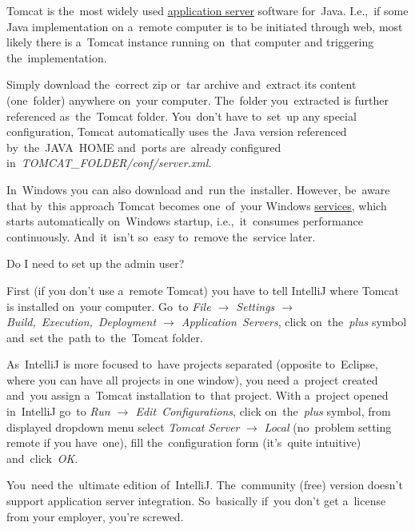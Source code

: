 \label{tomcat}
Tomcat is the~most widely used \hyperref[applicationserver]{application server} software for~Java. I.e.,~if some Java implementation on a~remote computer is to be initiated through web, most likely there is a~Tomcat instance running on~that computer and triggering the~implementation.

Simply download the~correct zip or~tar archive and~extract its content (one~folder) anywhere on~your computer. The~folder you~extracted is further referenced as~the~Tomcat folder. You~don't have to~set~up any special configuration, Tomcat automatically uses the~Java version referenced by~the~JAVA~HOME and~ports are~already configured in~\textit{TOMCAT\_FOLDER/conf/server.xml}.

\newline\warning In~Windows you can also download and~run the~installer. However, be~aware that by~this approach Tomcat becomes one~of~your Windows \hyperref[applicationprocessprogramservicethread]{services}, which starts automatically on~Windows startup, i.e.,~it~consumes performance continuously. And~it~isn't so~easy to~remove the~service later.

\newline\todo Do I need to set up the admin user?

First (if you don't use a~remote Tomcat) you have to tell IntelliJ where Tomcat is installed on~your computer. Go~to \textit{File $\rightarrow$ Settings $\rightarrow$ Build,~Execution,~Deployment $\rightarrow$ Application~Servers}, click on~the~\textit{plus} symbol and~set the~path to~the~Tomcat folder.

As~IntelliJ is more focused to~have projects separated (opposite to~Eclipse, where you can have all projects in one window), you need a~project created and~you assign a~Tomcat installation to~that project. With a~project opened in~IntelliJ go~to \textit{Run $\rightarrow$ Edit~Configurations}, click on~the~\textit{plus} symbol, from displayed dropdown menu select \textit{Tomcat Server} $\rightarrow$ \textit{Local} (no~problem setting remote if you have~one), fill the~configuration form (it's~quite intuitive) and~click~\textit{OK}.

\newline\warning You~need the~ultimate edition of~IntelliJ. The~community (free) version doesn't support application server integration. So~basically if~you don't get a~license from your employer, you're screwed.



